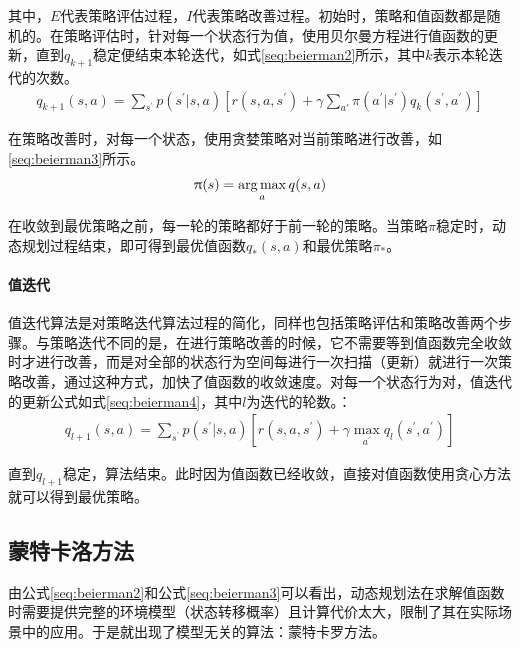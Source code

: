 其中，$E$代表策略评估过程，$I$代表策略改善过程。初始时，策略和值函数都是随机的。在策略评估时，针对每一个状态行为值，使用贝尔曼方程进行值函数的更新，直到$q_{k+1}$稳定便结束本轮迭代，如式\eqref{seq:beierman2}所示，其中$k$表示本轮迭代的次数。
\begin{equation}\label{seq:beierman2}
\begin{aligned}
q_{k+1}(s,a)=\sum_{s^{'}}p(s^{'}|s,a)[r(s,a,s^{'})+ \gamma \sum_{a'}\pi(a^{'}|s^{'}) q_{k}(s^{'},a^{'})]
\end{aligned}
\end{equation}

在策略改善时，对每一个状态，使用贪婪策略对当前策略进行改善，如\eqref{seq:beierman3}所示。
\begin{equation}\label{seq:beierman3}
\begin{aligned}
\uppi(s)=\operatorname*{arg\,max}_{a}q(s,a)
\end{aligned}
\end{equation}

在收敛到最优策略之前，每一轮的策略都好于前一轮的策略。当策略$\pi$稳定时，动态规划过程结束，即可得到最优值函数$q_{*}(s,a)$和最优策略$\pi_{*}$。
\paragraph{值迭代}

值迭代算法是对策略迭代算法过程的简化，同样也包括策略评估和策略改善两个步骤。与策略迭代不同的是，在进行策略改善的时候，它不需要等到值函数完全收敛时才进行改善，而是对全部的状态行为空间每进行一次扫描（更新）就进行一次策略改善，通过这种方式，加快了值函数的收敛速度。对每一个状态行为对，值迭代的更新公式如式\eqref{seq:beierman4}，其中$l$为迭代的轮数。：
\begin{equation}
\begin{aligned}\label{seq:beierman4}
q_{l+1}(s,a)=\sum_{s^{'}}p(s^{'}|s,a)[r(s,a,s^{'})+ \gamma \max_{a^{'}} q_{l}(s^{'},a^{'})]
\end{aligned}
\end{equation}

直到$q_{l+1}$稳定，算法结束。此时因为值函数已经收敛，直接对值函数使用贪心方法就可以得到最优策略。

\subsection{蒙特卡洛方法}
由公式\eqref{seq:beierman2}和公式\eqref{seq:beierman3}可以看出，动态规划法在求解值函数时需要提供完整的环境模型（状态转移概率）且计算代价太大，限制了其在实际场景中的应用。于是就出现了模型无关的算法：蒙特卡罗方法。

